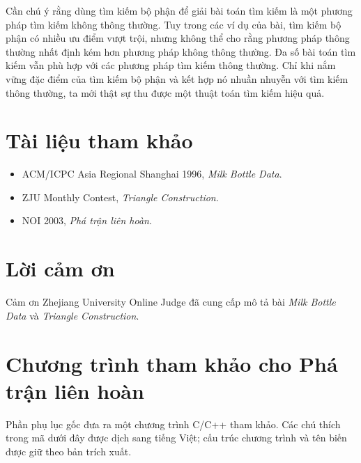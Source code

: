 \documentclass[11pt]{article}
\begin{document}
Cần chú ý rằng dùng tìm kiếm bộ phận để giải bài toán tìm kiếm là một phương
pháp tìm kiếm không thông thường. Tuy trong các ví dụ của bài, tìm kiếm bộ
phận có nhiều ưu điểm vượt trội, nhưng không thể cho rằng phương pháp thông
thường nhất định kém hơn phương pháp không thông thường. Đa số bài toán tìm
kiếm vẫn phù hợp với các phương pháp tìm kiếm thông thường. Chỉ khi nắm vững
đặc điểm của tìm kiếm bộ phận và kết hợp nó nhuần nhuyễn với tìm kiếm thông
thường, ta mới thật sự thu được một thuật toán tìm kiếm hiệu quả.

\section*{Tài liệu tham khảo}

\begin{itemize}
  \item ACM/ICPC Asia Regional Shanghai 1996, \textit{Milk Bottle Data}.
  \item ZJU Monthly Contest, \textit{Triangle Construction}.
  \item NOI 2003, \textit{Phá trận liên hoàn}.
\end{itemize}

\section*{Lời cảm ơn}

Cảm ơn Zhejiang University Online Judge đã cung cấp mô tả bài
\textit{Milk Bottle Data} và \textit{Triangle Construction}.

\appendix
\section{Chương trình tham khảo cho Phá trận liên hoàn}

Phần phụ lục gốc đưa ra một chương trình C/C++ tham khảo. Các chú thích trong
mã dưới đây được dịch sang tiếng Việt; cấu trúc chương trình và tên biến được
giữ theo bản trích xuất.
\end{document}
